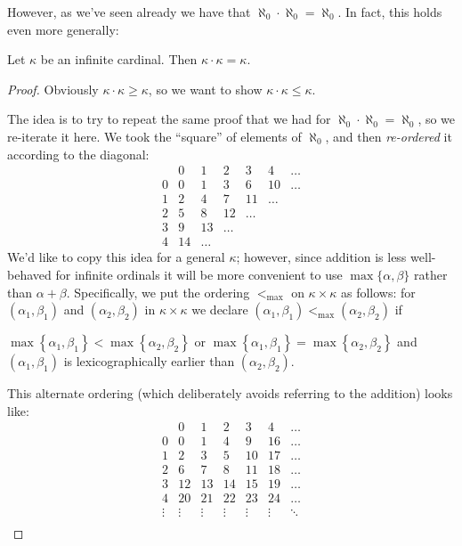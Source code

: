 However, as we've seen already we have that $\aleph_0 \cdot \aleph_0 = \aleph_0$.
In fact, this holds even more generally:

\begin{theorem}
	Let $\kappa$ be an infinite cardinal.
	Then $\kappa \cdot \kappa = \kappa$.
\end{theorem}
\begin{proof}
	Obviously $\kappa \cdot \kappa \ge \kappa$,
	so we want to show $\kappa \cdot \kappa \le \kappa$.

	The idea is to try to repeat the same proof
	that we had for $\aleph_0 \cdot \aleph_0 = \aleph_0$,
	so we re-iterate it here. We took the ``square'' of
	elements of $\aleph_0$, and then
	\emph{re-ordered} it according to the diagonal:
	\[
	\begin{array}{l|cccccc}
		  & 0 & 1 & 2 & 3 & 4 & \dots \\ \hline
		0 & 0 & 1 & 3 & 6 & 10 & \dots \\
		1 & 2 & 4 & 7 & 11 & \dots & \\
		2 & 5 & 8 & 12 & \dots & & \\
		3 & 9 & 13 & \dots & & & \\
		4 & 14 & \dots & & & &
	\end{array}
	\]
	We'd like to copy this idea for a general $\kappa$;
	however, since addition is less well-behaved for infinite ordinals
	it will be more convenient to use $\max\{\alpha,\beta\}$
	rather than $\alpha+\beta$.
	Specifically, we put the ordering $<_{\text{max}}$
	on $\kappa \times \kappa$ as follows:
	for $(\alpha_1, \beta_1)$ and $(\alpha_2, \beta_2)$ in $\kappa \times \kappa$
	we declare $(\alpha_1, \beta_1) <_{\text{max}} (\alpha_2, \beta_2)$ if
	\begin{itemize}
		\ii $\max \left\{ \alpha_1, \beta_1 \right\} < \max \left\{ \alpha_2, \beta_2 \right\}$ or
		\ii $\max \left\{ \alpha_1, \beta_1 \right\} = \max \left\{ \alpha_2, \beta_2 \right\}$ and $(\alpha_1, \beta_1)$
		is lexicographically earlier than $(\alpha_2, \beta_2)$.
	\end{itemize}
	This alternate ordering (which deliberately avoids referring
	to the addition) looks like:
	\[
	\begin{array}{l|cccccc}
		  & 0 & 1 & 2 & 3 & 4 & \dots \\ \hline
		0 & 0 & 1 & 4 & 9 & 16 & \dots \\
		1 & 2 & 3 & 5 & 10 & 17 & \dots \\
		2 & 6 & 7 & 8 & 11 & 18 & \dots \\
		3 & 12 & 13 & 14 & 15 & 19 & \dots \\
		4 & 20 & 21 & 22 & 23 & 24 & \dots \\
		\vdots & \vdots & \vdots & \vdots & \vdots & \vdots & \ddots \\
	\end{array}
	\]


\end{proof}
